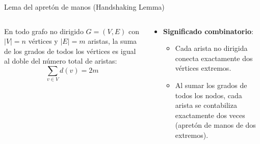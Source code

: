 \documentclass[
  ignorenonframetext,
]{beamer}
\providecommand{\tightlist}{%
  \setlength{\itemsep}{0pt}\setlength{\parskip}{0pt}}
\begin{document}
\begin{frame}{Lema del apretón de manos (Handshaking Lemma)}
\label{lema-del-apretuxf3n-de-manos-handshaking-lemma}
\begin{columns}[T]
\begin{column}{0.6\linewidth}
\begin{tcolorbox}[enhanced jigsaw, left=2mm, opacityback=0, titlerule=0mm, breakable, toptitle=1mm, rightrule=.15mm, bottomtitle=1mm, coltitle=black, title=\textcolor{quarto-callout-important-color}{\faExclamation}\hspace{0.5em}{Teorema de la suma de grados (Handshaking Lemma)}, colframe=quarto-callout-important-color-frame, colbacktitle=quarto-callout-important-color!10!white, arc=.35mm, toprule=.15mm, leftrule=.75mm, bottomrule=.15mm, opacitybacktitle=0.6, colback=white]

En todo grafo no dirigido \(G = (V, E)\) con \(|V| = n\) vértices y
\(|E| = m\) aristas, la suma de los grados de todos los vértices es
igual al doble del número total de aristas: \[
\sum_{v \in V} d(v) = 2m
\]

\end{tcolorbox}
\end{column}

\begin{column}{0.4\linewidth}
\begin{itemize}
\tightlist
\item
  \textbf{Significado combinatorio}:

  \begin{itemize}
  \tightlist
  \item
    Cada arista no dirigida conecta exactamente dos vértices extremos.
  \item
    Al sumar los grados de todos los nodos, cada arista se contabiliza
    exactamente dos veces (apretón de manos de dos extremos).
  \end{itemize}
\end{itemize}
\end{column}
\end{columns}
\end{frame}
\end{document}
